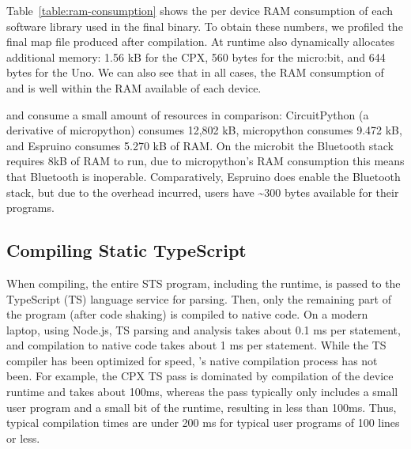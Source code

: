 Table~\ref{table:ram-consumption} shows the per device RAM consumption of each software library used in the final \MC binary. To obtain these numbers, we profiled the final map file produced after compilation. At runtime \MC also dynamically allocates additional memory: 1.56 kB for the CPX, 560 bytes for the micro:bit, and 644 bytes for the Uno. We can also see that in all cases, the RAM consumption of \MC and \CO is well within the RAM available of each device.

\MC and \CO consume a small amount of resources in comparison: CircuitPython (a derivative of micropython) consumes 12,802 kB, micropython consumes 9.472 kB, and Espruino consumes 5.270 kB of RAM. On the microbit the Bluetooth stack requires 8kB of RAM to run, due to micropython's RAM consumption this means that Bluetooth is inoperable. Comparatively, Espruino does enable the Bluetooth stack, but due to the overhead incurred, users have \textasciitilde300 bytes available for their programs.





\subsection{Compiling Static TypeScript}

When compiling, the entire STS program, including the runtime, is passed to the TypeScript (TS) language service for parsing. Then, only the remaining part of the program (after code shaking) is compiled to native code. On a modern laptop, using Node.js, TS parsing and analysis takes about 0.1 ms per statement, and \MC compilation to native code takes about 1 ms per statement.
While the TS compiler has been optimized for speed, \MCN's native compilation process has not been. For example, the CPX TS pass is dominated by compilation of the device runtime and takes about 100ms, whereas the \MC pass typically only includes a small user program and a small bit of the runtime, resulting in less than 100ms. Thus, typical compilation times are under 200 ms for typical user programs of 100 lines or less.

